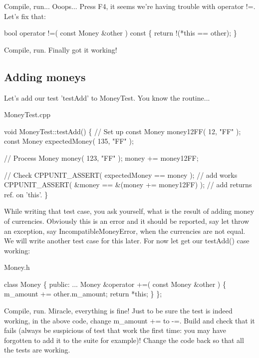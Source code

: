 Compile, run... Ooops... Press F4, it seems we're having trouble with {\ttfamily operator} {\ttfamily !=}. Let's fix that\+: 
\begin{DoxyCode}
\textcolor{keywordtype}{bool} operator !=( \textcolor{keyword}{const} Money &other )\textcolor{keyword}{ const}
\textcolor{keyword}{}\{
  \textcolor{keywordflow}{return} !(*\textcolor{keyword}{this} == other);
\}
\end{DoxyCode}


Compile, run. Finally got it working!\hypertarget{money_example_sec_opadd}{}\subsection{Adding moneys}\label{money_example_sec_opadd}
Let's add our test 'test\+Add' to Money\+Test. You know the routine...

{\ttfamily Money\+Test.\+cpp} 
\begin{DoxyCode}
\textcolor{keywordtype}{void} 
MoneyTest::testAdd()
\{
  \textcolor{comment}{// Set up}
  \textcolor{keyword}{const} Money money12FF( 12, \textcolor{stringliteral}{"FF"} );
  \textcolor{keyword}{const} Money expectedMoney( 135, \textcolor{stringliteral}{"FF"} );

  \textcolor{comment}{// Process}
  Money money( 123, \textcolor{stringliteral}{"FF"} );
  money += money12FF;

  \textcolor{comment}{// Check}
  CPPUNIT\_ASSERT( expectedMoney == money );           \textcolor{comment}{// add works}
  CPPUNIT\_ASSERT( &money == &(money += money12FF) );  \textcolor{comment}{// add returns ref. on 'this'.}
\}
\end{DoxyCode}


While writing that test case, you ask yourself, what is the result of adding money of currencies. Obviously this is an error and it should be reported, say let throw an exception, say {\ttfamily Incompatible\+Money\+Error}, when the currencies are not equal. We will write another test case for this later. For now let get our test\+Add() case working\+:

{\ttfamily Money.\+h} 
\begin{DoxyCode}
\textcolor{keyword}{class }Money
\{
\textcolor{keyword}{public}:
...
  Money &operator +=( \textcolor{keyword}{const} Money &other )
  \{
    m\_amount += other.m\_amount;
    \textcolor{keywordflow}{return} *\textcolor{keyword}{this};
  \}
\}; 
\end{DoxyCode}


Compile, run. Miracle, everything is fine! Just to be sure the test is indeed working, in the above code, change {\ttfamily m\+\_\+amount} {\ttfamily +=} to {\ttfamily -\/=}. Build and check that it fails (always be suspicious of test that work the first time\+: you may have forgotten to add it to the suite for example)! Change the code back so that all the tests are working.

